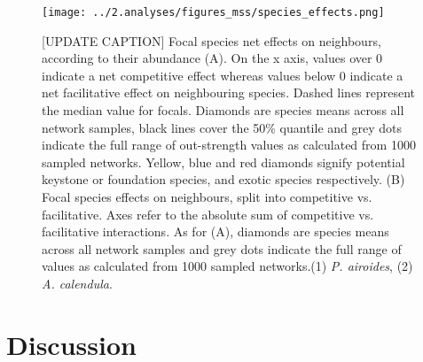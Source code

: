 \documentclass[a4,12pt]{article}
\begin{document}


    \begin{figure}[H]
        \begin{centering}
        \texttt{[image: ../2.analyses/figures\_mss/species\_effects.png]}
        \caption{[UPDATE CAPTION] Focal species net effects on neighbours, according to their abundance (A). On the x axis, values over 0 indicate a net competitive effect whereas values below 0 indicate a net facilitative effect on neighbouring species. Dashed lines represent the median value for focals. Diamonds are species means across all network samples, black lines cover the 50\% quantile and grey dots indicate the full range of out-strength values as calculated from 1000 sampled networks. Yellow, blue and red diamonds signify potential keystone or foundation species, and exotic species respectively. (B) Focal species effects on neighbours, split into competitive vs. facilitative. Axes refer to the absolute sum of competitive vs. facilitative interactions. As for (A), diamonds are species means across all network samples and grey dots indicate the full range of  values as calculated from 1000 sampled networks.(1) \textit{P. airoides}, (2) \textit{A. calendula}.}
        \label{fig:species}
        \end{centering}
    \end{figure} 





\section{Discussion}
    
\end{document}
